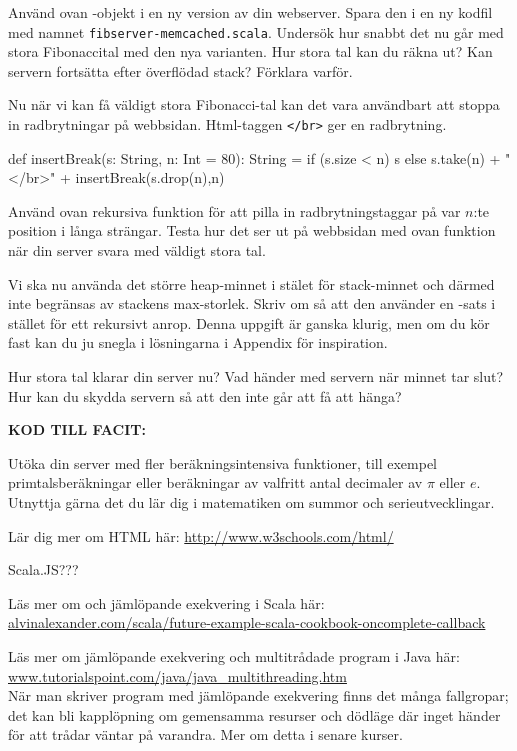 \Subtask Använd ovan -objekt i en ny version av din webserver. Spara den i en ny kodfil med namnet \texttt{fibserver-memcached.scala}. Undersök hur snabbt det nu går med stora Fibonaccital med den nya varianten. Hur stora tal kan du räkna ut? Kan servern fortsätta efter överflödad stack? Förklara varför.

\Subtask Nu när vi kan få väldigt stora Fibonacci-tal kan det vara användbart att stoppa in radbrytningar på webbsidan. Html-taggen \texttt{</br>} ger en radbrytning. 
\begin{Code}
  def insertBreak(s: String, n: Int = 80): String = {
    if (s.size < n) s 
    else s.take(n) + "</br>" + insertBreak(s.drop(n),n)
  }
\end{Code}
Använd ovan rekursiva funktion för att pilla in radbrytningstaggar på var $n$:te position i långa strängar. Testa hur det ser ut på webbsidan med ovan funktion när din server svara med väldigt stora tal.

\Subtask Vi ska nu använda det större heap-minnet i stälet för stack-minnet och därmed inte begränsas av stackens max-storlek. Skriv om  så att den använder en -sats i stället för ett rekursivt anrop. Denna uppgift är ganska klurig, men om du kör fast kan du ju snegla i lösningarna i Appendix för inspiration. 

Hur stora tal klarar din server nu? Vad händer med servern när minnet tar slut? Hur kan du skydda servern så att den inte går att få att hänga?

\textbf{KOD TILL FACIT:}

\Task Utöka din server med fler beräkningsintensiva funktioner, till exempel primtalsberäkningar eller beräkningar av valfritt antal decimaler av $\pi$ eller $e$. Utnyttja gärna det du lär dig i  matematiken om summor och serieutvecklingar.

\Task Lär dig mer om HTML här: \url{http://www.w3schools.com/html/}

\Task Scala.JS???


\Task Läs mer om  och jämlöpande exekvering i Scala här:\\
\href{http://alvinalexander.com/scala/future-example-scala-cookbook-oncomplete-callback}{alvinalexander.com/scala/future-example-scala-cookbook-oncomplete-callback}

\Task Läs mer om jämlöpande exekvering och multitrådade program i Java här: \href{http://www.tutorialspoint.com/java/java_multithreading.htm}{www.tutorialspoint.com/java/java\_multithreading.htm}  \\
\noindent När man skriver program med jämlöpande exekvering finns det många fallgropar; det kan bli kapplöpning  om gemensamma resurser och dödläge  där inget händer för att trådar väntar på varandra. Mer om detta i senare kurser. 

